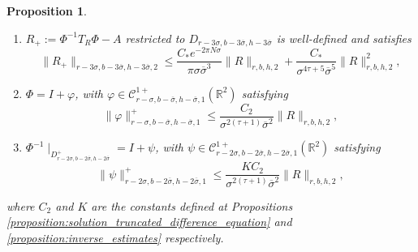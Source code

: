 \documentclass[10pt,a4paper]{amsart}
\newtheorem{proposition}{Proposition}
\newcommand{\Domain}[3]{D_{#1, #2, #3}}
\newcommand{\DomainP}[3]{D_{#1, #2, #3}^+}
\newcommand{\R}{\mathbb{R}}
\begin{document}
\begin{proposition}
\begin{enumerate}
\item $R_+ := \Phi^{-1} T_R\Phi - A$ restricted to $\Domain{r-3\sigma}{b-3\overline\sigma}{h-3\overline\sigma}$ %
is well-defined and satisfies
 \[
 \|R_+\|_{r-3\sigma,b-3\overline\sigma,h-3\overline\sigma,2}
 \leq \frac{C_\ast e^{-2\pi N\sigma}}{\pi\sigma\overline \sigma^3} \|R\|_{r,b,h,2} + \frac{C_\ast}{\sigma^{4\tau+5}\overline\sigma^5}\|R\|_{r,b,h,2}^2,
 \]
 \item  $\Phi=I+\varphi$, with $\varphi \in \mathscr C^{1+}_{r-\sigma,b-\overline\sigma,h-\overline\sigma, 1}(\R^2)$ satisfying
 \[
 \|\varphi\|_{r-\sigma,b-\overline\sigma,h-\overline\sigma,1}^+
 \leq 
 \frac{C_2}{\sigma^{2(\tau+1)}\overline\sigma^2}\|R\|_{r,b,h,2},
 \]
 \item $\Phi^{-1}\mid_{\DomainP{r-2\sigma}{b-2\overline\sigma}{h-2\overline\sigma}} = I+\psi$, with  $\psi \in \mathscr C^{1+}_{r-2\sigma,b-2\overline\sigma,h-2\overline\sigma, 1}(\R^2)$ satisfying
 \[
 \|\psi\|^+_{r-2\sigma,b-2\overline\sigma,h-2\overline\sigma,1} 
 \leq 
 \frac{KC_2}{\sigma^{2(\tau+1)}\overline\sigma^2}\|R\|_{r,b,h,2},
 \]
\end{enumerate}
 where $C_2$ and $K$ are the constants defined at Propositions \ref{proposition:solution_truncated_difference_equation} and \ref{proposition:inverse_estimates} respectively.
\end{proposition}
\end{document}
